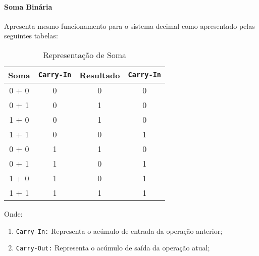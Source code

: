 \documentclass{article}
\begin{document}
            \paragraph{Soma Binária}Apresenta mesmo funcionamento para o sistema decimal como apresentado pelas seguintes tabelas:
                \begin{table}[H]
                    \centering  
                    \begin{tabular}[]{cc|cc}\hline
                        Soma & \texttt{Carry-In} & Resultado & \texttt{Carry-In}\\\hline
                        0 + 0 & 0 & 0 & 0\\
                        0 + 1 & 0 & 1 & 0\\
                        1 + 0 & 0 & 1 & 0\\
                        1 + 1 & 0 & 0 & 1\\
                        0 + 0 & 1 & 1 & 0\\
                        0 + 1 & 1 & 0 & 1\\
                        1 + 0 & 1 & 0 & 1\\
                        1 + 1 & 1 & 1 & 1\\\hline
                    \end{tabular}
                    \caption{Representação de Soma}
                \end{table}\noindent
            Onde:
                \begin{enumerate}[noitemsep]
                    \item \texttt{Carry-In:} Representa o acúmulo de entrada da operação anterior;
                    \item \texttt{Carry-Out:} Representa o acúmulo de saída da operação atual;
                \end{enumerate}
\end{document}
